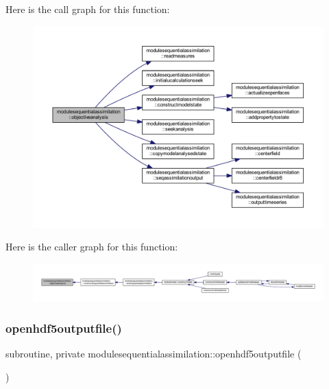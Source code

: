 Here is the call graph for this function\+:\nopagebreak
\begin{figure}[H]
\begin{center}
\leavevmode
\includegraphics[width=350pt]{namespacemodulesequentialassimilation_a09e6002fa92db2aafb977540ff4479fb_cgraph}
\end{center}
\end{figure}
Here is the caller graph for this function\+:\nopagebreak
\begin{figure}[H]
\begin{center}
\leavevmode
\includegraphics[width=350pt]{namespacemodulesequentialassimilation_a09e6002fa92db2aafb977540ff4479fb_icgraph}
\end{center}
\end{figure}
\mbox{\label{namespacemodulesequentialassimilation_a6440d55f49615b21ea0d328d0121e669}} 
\subsubsection{\texorpdfstring{openhdf5outputfile()}{openhdf5outputfile()}}
{\footnotesize\ttfamily subroutine, private modulesequentialassimilation\+::openhdf5outputfile (\begin{DoxyParamCaption}{ }\end{DoxyParamCaption})\hspace{0.3cm}{\ttfamily [private]}}

